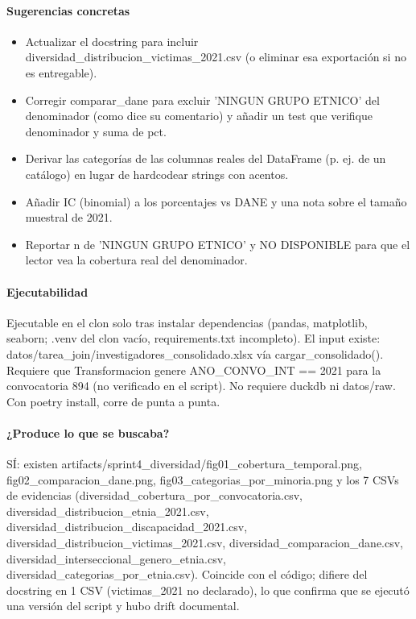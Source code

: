 \paragraph{Sugerencias concretas}
\begin{itemize}
  \item Actualizar el docstring para incluir diversidad\_distribucion\_victimas\_2021.csv (o eliminar esa exportación si no es entregable).
  \item Corregir comparar\_dane para excluir 'NINGUN GRUPO ETNICO' del denominador (como dice su comentario) y añadir un test que verifique denominador y suma de pct.
  \item Derivar las categorías de las columnas reales del DataFrame (p. ej. de un catálogo) en lugar de hardcodear strings con acentos.
  \item Añadir IC (binomial) a los porcentajes vs DANE y una nota sobre el tamaño muestral de 2021.
  \item Reportar n de 'NINGUN GRUPO ETNICO' y NO DISPONIBLE para que el lector vea la cobertura real del denominador.
\end{itemize}

\paragraph{Ejecutabilidad}
Ejecutable en el clon solo tras instalar dependencias (pandas, matplotlib, seaborn; .venv del clon vacío, requirements.txt incompleto). El input existe: datos/tarea\_join/investigadores\_consolidado.xlsx vía cargar\_consolidado(). Requiere que Transformacion genere ANO\_CONVO\_INT == 2021 para la convocatoria 894 (no verificado en el script). No requiere duckdb ni datos/raw. Con poetry install, corre de punta a punta.

\paragraph{¿Produce lo que se buscaba?}
SÍ: existen artifacts/sprint4\_diversidad/fig01\_cobertura\_temporal.png, fig02\_comparacion\_dane.png, fig03\_categorias\_por\_minoria.png y los 7 CSVs de evidencias (diversidad\_cobertura\_por\_convocatoria.csv, diversidad\_distribucion\_etnia\_2021.csv, diversidad\_distribucion\_discapacidad\_2021.csv, diversidad\_distribucion\_victimas\_2021.csv, diversidad\_comparacion\_dane.csv, diversidad\_interseccional\_genero\_etnia.csv, diversidad\_categorias\_por\_etnia.csv). Coincide con el código; difiere del docstring en 1 CSV (victimas\_2021 no declarado), lo que confirma que se ejecutó una versión del script y hubo drift documental.


